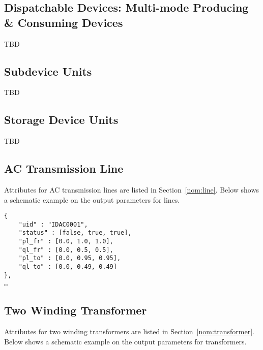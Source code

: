 \subsection{Dispatchable Devices: Multi-mode Producing \& Consuming Devices}
\begin{todo}[]{}
TBD
\end{todo}

\subsection{Subdevice Units}
\begin{todo}[]{}
TBD
\end{todo}

\subsection{Storage Device Units}
\begin{todo}[]{}
TBD
\end{todo}


\subsection{AC Transmission Line}
Attributes for AC transmission lines are listed in Section~\ref{nom:line}.
Below shows a schematic example on the output parameters for lines.

\begin{verbatim}
{
    "uid" : "IDAC0001",
    "status" : [false, true, true],
    "pl_fr" : [0.0, 1.0, 1.0],
    "ql_fr" : [0.0, 0.5, 0.5],
    "pl_to" : [0.0, 0.95, 0.95],
    "ql_to" : [0.0, 0.49, 0.49]
},
…     
\end{verbatim}



\subsection{Two Winding Transformer}
Attributes for two winding transformers are listed in Section~\ref{nom:transformer}.
Below shows a schematic example on the output parameters for transformers.

